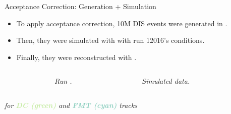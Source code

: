 \begin{frame}{Acceptance Correction: Generation + Simulation}
    \label{11.51::introduction}
    \begin{itemize}
        \item
            To apply acceptance correction, 10M DIS events were generated in .

        \item
            Then, they were simulated with  with run 12016's conditions.

        \item
            Finally, they were reconstructed with .
    \end{itemize}

    \vspace{-12pt}

    \begin{columns}[onlytextwidth,T]

    \begin{column}{.05\linewidth}\end{column} %

    \begin{column}{.35\linewidth}
        \begin{center}
            \begin{figure}[t]
                \textit{Run .}
            \end{figure}
        \end{center}
    \end{column}

    \begin{column}{.35\linewidth}
        \begin{center}
            \begin{figure}[t]
                \textit{Simulated data.}
            \end{figure}
        \end{center}
    \end{column}

    \begin{column}{.05\linewidth}\end{column} %

    \end{columns}

    \begin{center}
        \textit{ for \textbf{\textcolor[HTML]{c7eca6}{DC (green)}} and \textbf{\textcolor[HTML]{8dcfbf}{FMT (cyan)}} tracks}
    \end{center}
\end{frame}

